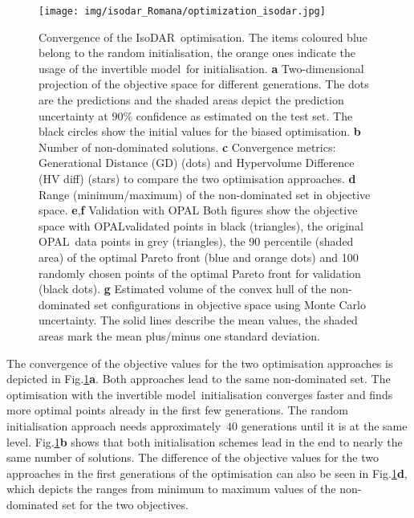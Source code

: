 \documentclass[a4paper, 12pt, version-1-compatibility]{article}
\def\invertiblemodel{invertible model}
\def\isodar{IsoDAR}
\def\opal{OPAL}
\newcommand{\figref}[1]{Fig.\xspace\ref{#1}}
\begin{document}
\begin{figure}[ht!]
    \centering
    \texttt{[image: img/isodar\_Romana/optimization\_isodar.jpg]}
    \caption{Convergence of the \isodar\ optimisation. The items coloured blue belong to the random initialisation, the orange ones indicate the usage of the \invertiblemodel\ for initialisation. \textbf{a} Two-dimensional projection of the objective space for different generations. The dots are the predictions and the shaded areas depict the prediction uncertainty at $90\%$ confidence as estimated on the test set. The black circles show the initial values for the biased optimisation. \textbf{b} Number of non-dominated solutions. \textbf{c} Convergence metrics: Generational Distance (GD) (dots) and Hypervolume Difference (HV diff) (stars) to compare the two optimisation approaches. \textbf{d} Range (minimum/maximum) of the non-dominated set in objective space.  \textbf{e},\textbf{f} Validation with \opal\: Both figures show the objective space with \opal\-validated points in black (triangles), the original \opal\ data points in grey (triangles), the 90 percentile (shaded area) of the optimal Pareto front (blue and orange dots) and 100 randomly chosen points of the optimal Pareto front for validation (black dots). \textbf{g} Estimated volume of the convex hull of the non-dominated set configurations in objective space using Monte Carlo uncertainty. The solid lines describe the mean values, the shaded areas mark the mean plus/minus one standard deviation.
}
    \label{fig:isodar_optimization}
\end{figure}

The convergence of the objective values for the two optimisation approaches is depicted in \figref{fig:isodar_optimization}\textbf{a}. Both approaches lead to the same non-dominated set. The optimisation with the \invertiblemodel\ initialisation converges faster and finds more optimal points already in the first few generations. The random initialisation approach needs approximately\ $40$ generations until it is at the same level. \figref{fig:isodar_optimization}\textbf{b} shows that both initialisation schemes lead in the end to nearly the same number of solutions.
The difference of the objective values for the two approaches in the first generations of the optimisation can also be seen in \figref{fig:isodar_optimization}\textbf{d}, which depicts the ranges from minimum to maximum values of the non-dominated set for the two objectives.
\end{document}
